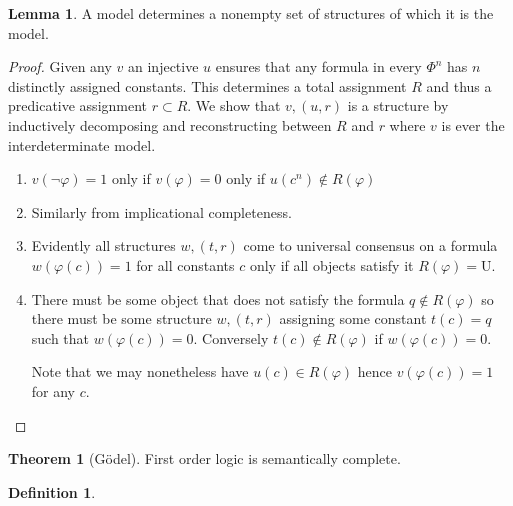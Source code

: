 \documentclass{amsbook}
\theoremstyle{definition}
\newtheorem{thm}{Theorem}[section]
\newtheorem{lmm}{Lemma}[section]
\newtheorem{dfn}{Definition}[section]
\begin{document}
\begin{lmm}
    A model determines a nonempty set of structures of which it is the model.
    \begin{proof}
        Given any $v$ an injective $u$ ensures that any formula in every $\Phi^n$ has $n$ distinctly assigned constants. This determines a total assignment $R$ and thus a predicative assignment $r \subset R$. We show that $v, (u, r)$ is a structure by inductively decomposing and reconstructing between $R$ and $r$ where $v$ is ever the interdeterminate model.
        \begin{enumerate}
            \item $v(\neg\varphi) = 1$ only if $v(\varphi) = 0$ only if $u(c^n) \notin R(\varphi)$
            \item Similarly from implicational completeness.
            \item Evidently all structures $w, (t, r)$ come to universal consensus on a formula $w(\varphi(c)) = 1$ for all constants $c$ only if all objects satisfy it $R(\varphi) = \mathrm U$.
            \item There must be some object that does not satisfy the formula $q \notin R(\varphi)$ so there must be some structure $w, (t, r)$ assigning some constant $t(c) = q$ such that $w(\varphi(c)) = 0$. Conversely $t(c) \notin R(\varphi)$ if $w(\varphi(c)) = 0$.

                  Note that we may nonetheless have $u(c) \in R(\varphi)$ hence $v(\varphi(c)) = 1$ for any $c$.
        \end{enumerate}
    \end{proof}
\end{lmm}

\begin{thm}[G\"odel]
    First order logic is semantically complete.
\end{thm}

\begin{dfn}

\end{dfn}




\newpage
\end{document}
